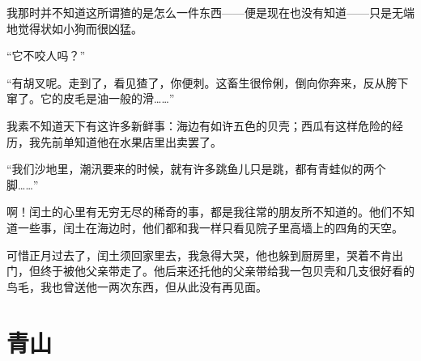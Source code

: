 \documentclass[12pt,UTF-8,openany]{ctexbook}
\begin{document}
\begin{Large}
    我那时并不知道这所谓猹的是怎么一件东西——便是现在也没有知道——只是无端地觉得状如小狗而很凶猛。
    
    “它不咬人吗？”
    
    “有胡叉呢。走到了，看见猹了，你便刺。这畜生很伶俐，倒向你奔来，反从胯下窜了。它的皮毛是油一般的滑……”
    
    我素不知道天下有这许多新鲜事：海边有如许五色的贝壳；西瓜有这样危险的经历，我先前单知道他在水果店里出卖罢了。
    
    “我们沙地里，潮汛要来的时候，就有许多跳鱼儿只是跳，都有青蛙似的两个脚……”
    
    啊！闰土的心里有无穷无尽的稀奇的事，都是我往常的朋友所不知道的。他们不知道一些事，闰土在海边时，他们都和我一样只看见院子里高墙上的四角的天空。
    
    可惜正月过去了，闰土须回家里去，我急得大哭，他也躲到厨房里，哭着不肯出门，但终于被他父亲带走了。他后来还托他的父亲带给我一包贝壳和几支很好看的鸟毛，我也曾送他一两次东西，但从此没有再见面。
    
\end{Large}

\chapter{青山}
\end{document}
